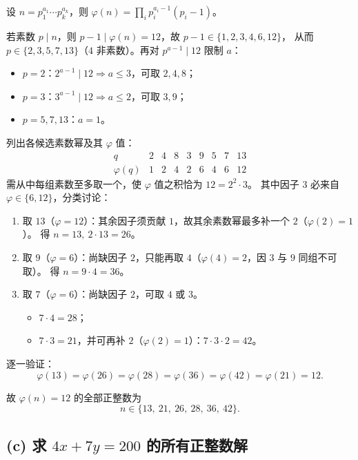 \documentclass{article}
\begin{document}
\begin{solution}
设 $n=p_1^{a_1}\cdots p_k^{a_k}$，则 $\varphi(n)=\prod_i p_i^{a_i-1}(p_i-1)$。

若素数 $p\mid n$，则 $p-1\mid \varphi(n)=12$，故 $p-1\in\{1,2,3,4,6,12\}$，
从而 $p\in\{2,3,5,7,13\}$（$4$ 非素数）。再对 $p^{a-1}\mid 12$ 限制 $a$：
\begin{itemize}
  \item $p=2$：$2^{a-1}\mid 12\Rightarrow a\le 3$，可取 $2,4,8$；
  \item $p=3$：$3^{a-1}\mid 12\Rightarrow a\le 2$，可取 $3,9$；
  \item $p=5,7,13$：$a=1$。
\end{itemize}
列出各候选素数幂及其 $\varphi$ 值：
\[
\begin{array}{c|ccccccccc}
  q & 2 & 4 & 8 & 3 & 9 & 5 & 7 & 13\\ \hline
  \varphi(q) & 1 & 2 & 4 & 2 & 6 & 4 & 6 & 12
\end{array}
\]
需从中每组素数至多取一个，使 $\varphi$ 值之积恰为 $12=2^2\cdot 3$。
其中因子 $3$ 必来自 $\varphi\in\{6,12\}$，分类讨论：

\begin{enumerate}[(1)]
  \item 取 $13$（$\varphi=12$）：其余因子须贡献 $1$，故其余素数幂最多补一个 $2$（$\varphi(2)=1$）。
    得 $n=13,\ 2\cdot 13=26$。
  \item 取 $9$（$\varphi=6$）：尚缺因子 $2$，只能再取 $4$（$\varphi(4)=2$，因 $3$ 与 $9$ 同组不可取）。
    得 $n=9\cdot 4=36$。
  \item 取 $7$（$\varphi=6$）：尚缺因子 $2$，可取 $4$ 或 $3$。
    \begin{itemize}
      \item $7\cdot 4=28$；
      \item $7\cdot 3=21$，并可再补 $2$（$\varphi(2)=1$）：$7\cdot 3\cdot 2=42$。
    \end{itemize}
\end{enumerate}
逐一验证：
\[
  \varphi(13)=\varphi(26)=\varphi(28)=\varphi(36)=\varphi(42)=\varphi(21)=12.
\]

\medskip\noindent
故 $\varphi(n)=12$ 的全部正整数为
\[
  \boxed{n\in\{13,\ 21,\ 26,\ 28,\ 36,\ 42\}.}
\]
\end{solution}

\subsection*{(c) 求 $4x+7y=200$ 的所有正整数解}
\end{document}
